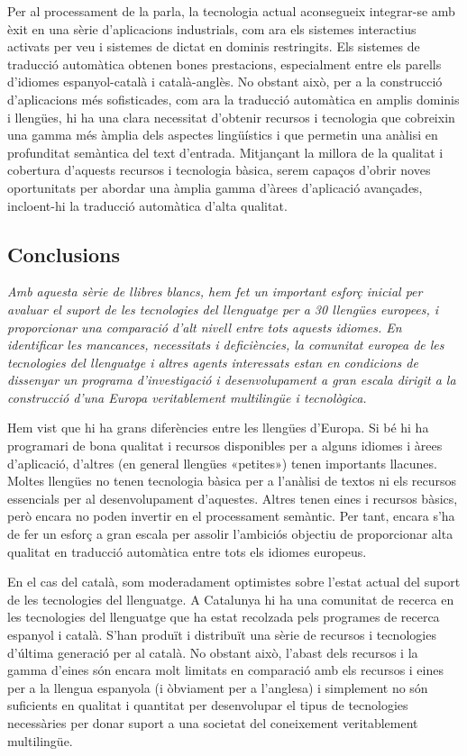 \begin{multicols}{2}
Per al processament de la parla, la tecnologia actual aconsegueix integrar-se amb èxit en una sèrie d'aplicacions industrials, com ara els sistemes interactius activats per veu i sistemes de dictat en dominis restringits. Els sistemes de traducció automàtica obtenen bones prestacions, especialment entre els parells d'idiomes espanyol-català i català-anglès. No obstant això, per a la construcció d'aplicacions més sofisticades, com ara la traducció automàtica en amplis dominis i llengües, hi ha una clara necessitat d'obtenir recursos i tecnologia que cobreixin una gamma més àmplia dels aspectes lingüístics i que permetin una anàlisi en profunditat semàntica del text d'entrada. Mitjançant la millora de la qualitat i cobertura d'aquests recursos i tecnologia bàsica, serem capaços d'obrir noves oportunitats per abordar una àmplia gamma d'àrees d'aplicació avançades, incloent-hi la traducció automàtica d'alta qualitat.

\subsection{Conclusions}

\emph{Amb aquesta sèrie de llibres blancs, hem fet un important esforç inicial per avaluar el suport de les tecnologies del llenguatge per a 30 llengües europees, i proporcionar una comparació d'alt nivell entre tots aquests idiomes. En identificar les mancances, necessitats i deficiències, la comunitat europea de les tecnologies del llenguatge i altres agents interessats estan en condicions de dissenyar un programa d’investigació i desenvolupament a gran escala dirigit a la construcció d'una Europa veritablement multilingüe i tecnològica.}

Hem vist que hi ha grans diferències entre les llengües d'Europa. Si bé hi ha programari de bona qualitat i recursos disponibles per a alguns idiomes i àrees d'aplicació, d’altres (en general llengües «petites») tenen importants llacunes. Moltes llengües no tenen tecnologia bàsica per a l'anàlisi de textos ni els recursos essencials per al desenvolupament d'aquestes. Altres tenen eines i recursos bàsics, però encara no poden invertir en el processament semàntic. Per tant, encara s'ha de fer un esforç a gran escala per assolir l'ambiciós objectiu de proporcionar alta qualitat en traducció automàtica entre tots els idiomes europeus.

En el cas del català, som moderadament optimistes sobre l'estat actual del suport de les tecnologies del llenguatge. A Catalunya hi ha una comunitat de recerca en les tecnologies del llenguatge que ha estat recolzada pels programes de recerca espanyol i català. S’han produït i distribuït una sèrie de recursos i tecnologies d'última generació per al català. No obstant això, l'abast dels recursos i la gamma d'eines són encara molt limitats en comparació amb els recursos i eines per a la llengua espanyola (i òbviament per a l'anglesa) i simplement no són suficients en qualitat i quantitat per desenvolupar el tipus de tecnologies necessàries per donar suport a una societat del coneixement veritablement multilingüe.


\end{multicols}
